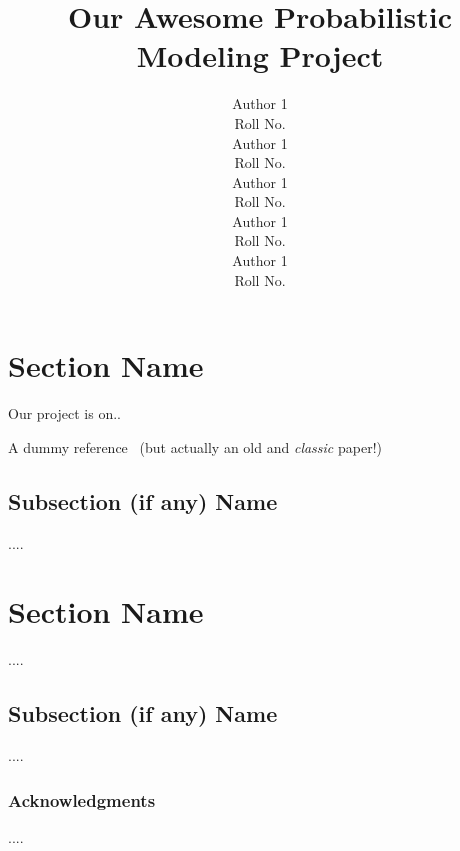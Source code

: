 \documentclass{article} %
\title{Our Awesome Probabilistic Modeling Project}
\author{
Author 1 \\
Roll No. \\
\And
Author 1 \\
Roll No. \\
\AND
Author 1 \\
Roll No. \\
\And
Author 1 \\
Roll No. \\
\And
Author 1 \\
Roll No. \\
}
\begin{document}
\maketitle

\section{Section Name}

Our project is on..

A dummy reference~\cite{geman1984stochastic} (but actually an old and \emph{classic} paper!)

\subsection{Subsection (if any) Name}

....

\section{Section Name}

....

\subsection{Subsection (if any) Name}

....


\subsubsection*{Acknowledgments}

....

% 
% 



\end{document}
